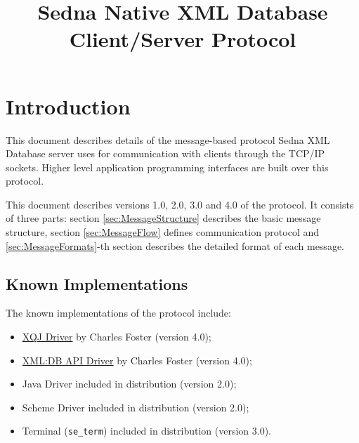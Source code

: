 \documentclass[a4paper,12pt]{article}
\title{Sedna Native XML Database Client/Server Protocol}
\date{}
\newcommand{\TocAt}[6]{}   %
\begin{document}
\sloppy
\maketitle

\TocAt*{section,subsection,subsubsection}
\TocAt*{subsection,subsubsection}

\tableofcontents
\newpage

\section{Introduction}
This document describes details of the message-based protocol Sedna XML Database
server uses for communication with clients through the TCP/IP sockets. Higher
level application programming interfaces are built over this protocol.

This document describes versions 1.0, 2.0, 3.0 and 4.0 of the protocol. It
consists of three parts: section \ref{sec:MessageStructure} describes the basic
message structure, section \ref{sec:MessageFlow} defines communication protocol
and \ref{sec:MessageFormats}-th section describes the detailed format of each
message.


\subsection{Known Implementations}

The known implementations of the protocol include:
\begin{itemize}
\item \href{http://www.cfoster.net/sedna/xqj/}{XQJ Driver} by Charles Foster
(version 4.0);
\item \href{http://www.cfoster.net/sedna/}{XML:DB API Driver} by Charles Foster
(version 4.0);
\item Java Driver included in distribution (version 2.0);
\item Scheme Driver included in distribution (version 2.0);
\item Terminal (\verb!se_term!) included in distribution (version 3.0).
\end{itemize}

\newpage


\end{document}
